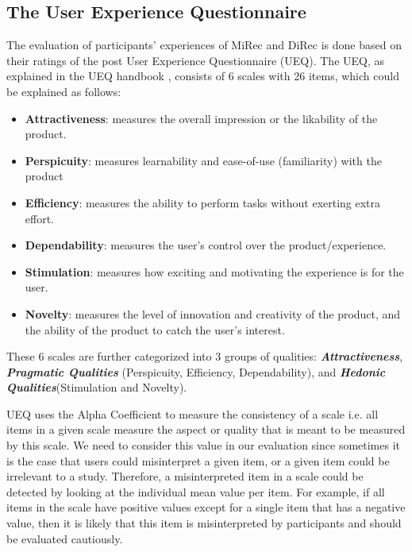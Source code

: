 \subsection{The User Experience Questionnaire}
The evaluation of participants' experiences of MiRec and DiRec is done based
on their ratings of the post User Experience Questionnaire (UEQ). The UEQ, as
explained in the UEQ handbook \cite{UEQHandbook}, consists of 6 scales with 26
items, which could be explained as follows:
\begin{itemize}
  \item \textbf{Attractiveness}: measures the overall impression or the
  likability of the product.
  \item \textbf{Perspicuity}: measures learnability and ease-of-use
  (familiarity) with the product
  \item \textbf{Efficiency}: measures the ability to perform tasks without
  exerting extra effort.
  \item \textbf{Dependability}: measures the user's control over the
  product/experience.
  \item \textbf{Stimulation}: measures how exciting and motivating the
  experience is for the user.
  \item \textbf{Novelty}: measures the level of innovation and creativity of the
  product, and the ability of the product to catch the user's interest.
\end{itemize}
These 6 scales are further categorized into 3 groups of qualities:
\textbf{\textit{Attractiveness}}, \textbf{\textit{Pragmatic
Qualities}} (Perspicuity, Efficiency, Dependability), and
\textbf{\textit{Hedonic Qualities}}(Stimulation and Novelty).\par 
UEQ uses the Alpha Coefficient to measure the consistency of a scale i.e.
all items in a given scale  measure the aspect or quality that is meant to be
measured by this scale.
We need to consider this value in our evaluation since sometimes it is the case
that users could misinterpret a given item, or a given item could be irrelevant
to a study. Therefore, a misinterpreted item in a scale could be detected by
looking at the individual mean value per item. For example, if all items in the
scale have positive values except for a single item that has a negative value,
then it is likely that this item is misinterpreted by participants and should be
evaluated cautiously.\par
